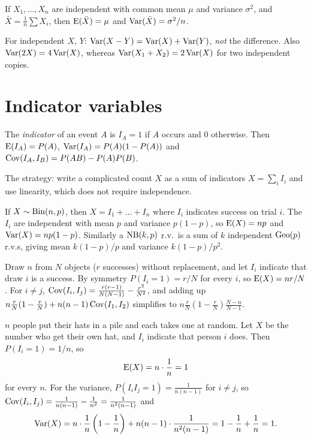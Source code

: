 \begin{corollary}
If $X_1,\dots,X_n$ are independent with common mean $\mu$ and variance $\sigma^2$, and
$\bar X = \frac1n\sum X_i$, then $\operatorname{E}(\bar X) = \mu$ and $\operatorname{Var}(\bar X) = \sigma^2/n$.
\end{corollary}

\begin{important}
For independent $X$, $Y$: $\operatorname{Var}(X-Y) = \operatorname{Var}(X) + \operatorname{Var}(Y)$, \emph{not} the difference.
Also $\operatorname{Var}(2X) = 4\operatorname{Var}(X)$, whereas $\operatorname{Var}(X_1+X_2) = 2\operatorname{Var}(X)$ for two independent copies.
\end{important}

\section{Indicator variables}

\begin{definition}[Indicator]
The \emph{indicator} of an event $A$ is $I_A = 1$ if $A$ occurs and $0$ otherwise. Then
$\operatorname{E}(I_A) = P(A)$, $\operatorname{Var}(I_A) = P(A)(1 - P(A))$ and
$\operatorname{Cov}(I_A, I_B) = P(AB) - P(A)P(B)$.
\end{definition}

The strategy: write a complicated count $X$ as a sum of indicators $X = \sum_i I_i$ and
use linearity, which does not require independence.

\begin{example}
If $X\sim\operatorname{Bin}(n,p)$, then $X = I_1+\dots+I_n$ where $I_i$ indicates success on trial $i$.
The $I_i$ are independent with mean $p$ and variance $p(1-p)$, so $\operatorname{E}(X) = np$ and
$\operatorname{Var}(X) = np(1-p)$. Similarly a $\operatorname{NB}(k,p)$ r.v.\ is a sum of $k$ independent $\operatorname{Geo}(p)$
r.v.s, giving mean $k(1-p)/p$ and variance $k(1-p)/p^2$.
\end{example}

\begin{example}
Draw $n$ from $N$ objects ($r$ successes) without replacement, and let $I_i$ indicate that
draw $i$ is a success. By symmetry $P(I_i = 1) = r/N$ for every $i$, so
$\operatorname{E}(X) = nr/N$. For $i\ne j$,
$\operatorname{Cov}(I_i,I_j) = \frac{r(r-1)}{N(N-1)} - \frac{r^2}{N^2}$, and adding up
$n\frac rN(1-\frac rN) + n(n-1)\operatorname{Cov}(I_1,I_2)$ simplifies to
$n\frac rN\left(1-\frac rN\right)\frac{N-n}{N-1}$.
\end{example}

\begin{example}
$n$ people put their hats in a pile and each takes one at random. Let $X$ be the number who
get their own hat, and $I_i$ indicate that person $i$ does. Then $P(I_i = 1) = 1/n$, so
\[
  \operatorname{E}(X) = n\cdot\frac1n = 1
\]
for every $n$. For the variance, $P(I_iI_j = 1) = \frac{1}{n(n-1)}$ for $i\ne j$, so
$\operatorname{Cov}(I_i,I_j) = \frac{1}{n(n-1)} - \frac1{n^2} = \frac{1}{n^2(n-1)}$ and
\[
  \operatorname{Var}(X) = n\cdot\frac1n\left(1-\frac1n\right) + n(n-1)\cdot\frac{1}{n^2(n-1)}
  = 1 - \frac1n + \frac1n = 1.
\]
\end{example}

